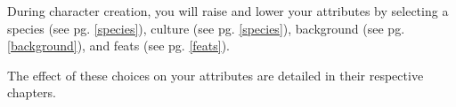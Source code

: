 During character creation, you will raise and lower your attributes by 
selecting a species (see pg. \ref{species}), culture (see pg. \ref{species}),
background (see pg. \ref{background}), and feats (see pg. \ref{feats}).

The effect of these choices on your attributes are detailed in their respective
chapters.



%
